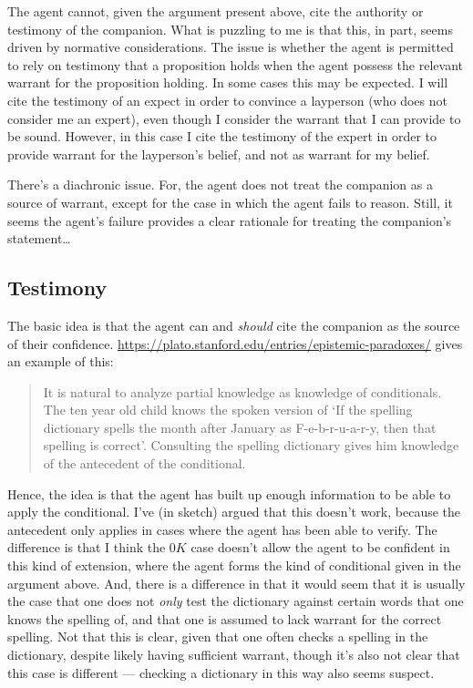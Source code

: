 \documentclass[10pt]{article}
\begin{document}
The agent cannot, given the argument present above, cite the authority or testimony of the companion.
What is puzzling to me is that this, in part, seems driven by normative considerations.
The issue is whether the agent is permitted to rely on testimony that a proposition holds when the agent possess the relevant warrant for the proposition holding.
In some cases this may be expected.
I will cite the testimony of an expect in order to convince a layperson (who does not consider me an expert), even though I consider the warrant that I can provide to be sound.
However, in this case I cite the testimony of the expert in order to provide warrant for the layperson's belief, and not as warrant for my belief.

There's a diachronic issue.
For, the agent does not treat the companion as a source of warrant, except for the case in which the agent fails to reason.
Still, it seems the agent's failure provides a clear rationale for treating the companion's statement\dots


\subsection{Testimony}
\label{sec:testimony-1}

The basic idea is that the agent can and \emph{should} cite the companion as the source of their confidence.
\url{https://plato.stanford.edu/entries/epistemic-paradoxes/} gives an example of this:
\begin{quote}
  It is natural to analyze partial knowledge as knowledge of conditionals. The ten year old child knows the spoken version of ‘If the spelling dictionary spells the month after January as F-e-b-r-u-a-r-y, then that spelling is correct’. Consulting the spelling dictionary gives him knowledge of the antecedent of the conditional.
\end{quote}
Hence, the idea is that the agent has built up enough information to be able to apply the conditional.
I've (in sketch) argued that this doesn't work, because the antecedent only applies in cases where the agent has been able to verify.
The difference is that I think the \(0K\) case doesn't allow the agent to be confident in this kind of extension, where the agent forms the kind of conditional given in the argument above.
And, there is a difference in that it would seem that it is usually the case that one does not \emph{only} test the dictionary against certain words that one knows the spelling of, and that one is assumed to lack warrant for the correct spelling.
Not that this is clear, given that one often checks a spelling in the dictionary, despite likely having sufficient warrant, though it's also not clear that this case is different --- checking a dictionary in this way also seems suspect.
\end{document}
